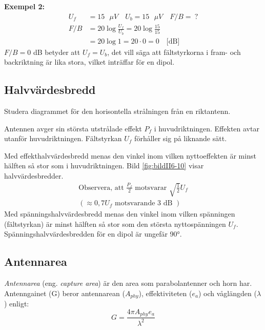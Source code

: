 \noindent\textbf{Exempel 2:}
\begin{align*}
  U_f &= 15 \text{ \(\mu V\)} \quad U_b = 15\text{ \(\mu V\)} \quad F/B =\ ? \\
  F/B &= 20 \log\frac{U_f}{U_b} = 20 \log\frac{15}{15} \\
  &= 20 \log 1 = 20 \cdot 0 = 0 \quad \text{[dB]}
\end{align*}
\(F/B = 0\) dB betyder att \(U_f = U_b\), det vill säga att fältstyrkorna i
fram- och backriktning är lika stora, vilket inträffar för en dipol.

\subsection{Halvvärdesbredd}

Studera diagrammet för den horisontella strålningen från en riktantenn.

Antennen avger sin största utstrålade effekt \(P_f\) i huvudriktningen.
Effekten avtar utanför huvudriktningen.
Fältstyrkan \(U_f\) förhåller sig på liknande sätt.

Med effekthalvvärdesbredd menas den vinkel inom vilken nyttoeffekten
är minst hälften så stor som i huvudriktningen.
Bild \ref{fig:bildII6-10} visar halvvärdesbredder.
\begin{gather*}
  \text{Observera, att } \frac{P_f}{2} \text{ motsvarar }
  \sqrt{\frac{1}{2}}U_f \\
  ( \approx 0,7 U_f \text{ motsvarande 3 dB })
\end{gather*}
Med spänningshalvvärdesbredd menas den vinkel inom vilken spänningen
(fältstyrkan) är minst hälften så stor som den största nyttospänningen \(U_f\).
Spänningshalvvärdesbredden för en dipol är ungefär \ang{90}.


\subsection{Antennarea}

\emph{Antennarea} (eng. \emph{capture area}) är den area som parabolantenner
och horn har.
Antenngainet (G) beror antennarean (\(A_{phy}\)), effektiviteten (\(e_a\)) och
våglängden (\(\lambda\)) enligt:
\[ G = \frac{4\pi A_{phy}e_a}{\lambda^2} \]
